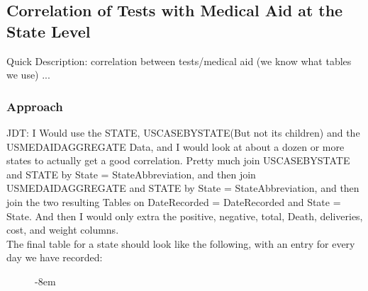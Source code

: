 \documentclass[11pt]{article}
\begin{document}
\pagebreak

\subsection{Correlation of Tests with Medical Aid at the State Level}

\noindent
Quick Description: correlation between tests/medical aid (we know what tables we use) ...

\subsubsection{Approach}

\noindent
JDT: I Would use the STATE, USCASEBYSTATE(But not its children) and the USMEDAIDAGGREGATE Data, and I would look at about a dozen or more states to actually get a good correlation. Pretty much join USCASEBYSTATE and STATE by State = StateAbbreviation, and then join USMEDAIDAGGREGATE and STATE by State = StateAbbreviation, and then join the two resulting Tables on DateRecorded = DateRecorded and State = State. And then I would only extra the positive, negative, total, Death, deliveries, cost, and weight columns. \\

\noindent
The final table for a state should look like the following, with an entry for every day we have recorded:

\begin{figure}[H]
\begin{adjustwidth*}{}{-8em}
\centering
{}%
\end{adjustwidth*}
\end{figure}
\end{document}
